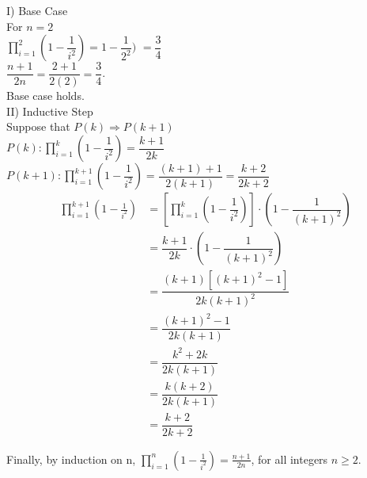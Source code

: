 \documentclass[paper=letter, fontsize=11pt]{scrartcl} %
\begin{document}
I) Base Case \\

For $n = 2$ \\
$\prod\limits_{i=1}^2 (1 - \dfrac{1}{i^2}) = 1 - \dfrac{1}{2^2})$
$= \dfrac{3}{4}$ \\ 

$ \dfrac{n+1}{2n} = \dfrac{2+1}{2(2)} = \dfrac{3}{4} $.\\
Base case holds. \\

II) Inductive Step \\

Suppose that $P(k) \Rightarrow P(k+1)$\\
$P(k): \prod\limits_{i=1}^k (1 - \dfrac{1}{i^2}) = \dfrac{k + 1}{2k}$ \\
$P(k+1): \prod\limits_{i=1}^{k+1} (1 - \dfrac{1}{i^2})
 = \dfrac{(k+1) + 1}{2(k+1)} = \dfrac{k + 2}{2k + 2}$ \\

\begin{align*}
	\prod_{i=1}^{k+1} (1 - \frac{1}{i^2}) &=
	[\prod_{i=1}^k (1- \dfrac{1}{i^2})] \cdot (1 - \dfrac{1}{(k+1)^2}) \\
	&= \dfrac{k+1}{2k} \cdot (1 - \dfrac{1}{(k+1)^2}) \\
	&= \dfrac{(k+1)[(k+1)^2 - 1]}{2k(k+1)^2} \\
	&= \dfrac{(k+1)^2 - 1}{2k(k+1)} \\
	&= \dfrac{k^2 + 2k}{2k(k+1)} \\
	&= \dfrac{k(k+2)}{2k(k+1)} \\
	&= \dfrac{k+2}{2k+2}
\end{align*}

Finally, by induction on n, $\prod\limits_{i=1}^n (1 - \frac{1}{i^2})
= \frac{n + 1}{2n}$, for all integers $n \ge 2$.
\end{document}

